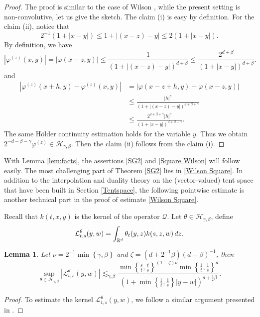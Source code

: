 \documentclass[oneside,english,a4wide]{amsart}
\numberwithin{equation}{section}
\numberwithin{figure}{section}
\theoremstyle{plain}
\theoremstyle{plain}
\theoremstyle{definition}
\theoremstyle{plain}
\newtheorem{lemma}[thm]{Lemma}
\theoremstyle{remark}
\theoremstyle{definition}
\theoremstyle{remark}
\theoremstyle{definition}
\newcommand{\real}{{\mathbb R}}
\renewcommand{\L}{{\mathcal L}}
\newcommand{\Q}{{\mathcal Q}}
\newcommand{\f}{\varphi}
\newcommand{\8}{+\infty}
\renewcommand{\1}{\mathbbm{1}}
\newcommand\sk[1]{ \left( #1 \right) }
\newcommand\lk[1]{ \left\{ #1 \right\} }
\renewcommand\d{{\rm d}}
\begin{document}
{\begin{proof}
The proof is similar to the case of Wilson \cite{Wilson2007}, while the present setting is non-convolutive, let us  give the sketch. The claim (i) is easy by definition. For the claim (ii), notice that
\[
    2^{-1} (1 + |x-y|) \leq  1 + |(x-z) - y| \leq 2(1 + |x- y|). 
\]
By definition, we have
\[
    |\f^{(z)}(x, y)| = | \f(x-z, y) | \leq \frac{1}{(1 + |(x-z) - y |)^{d+\beta} } \leq  \frac{2^{d+\beta}}{(1 + |x- y|)^{d+\beta}}.
\]
and 
\[
\begin{aligned}
    |\f^{(z)}(x + h, y) - \f^{(z)}(x, y)| & = | \f(x-z + h, y) - \f(x-z, y) | \\
    & \leq \frac{|h|^{\gamma}}{(1 + |(x-z) - y |)^{d+\beta + \gamma} } \\
    & \leq  \frac{2^{d+\beta + \gamma}|h|^{\gamma}}{(1 + |x- y|)^{d+\beta+\gamma}}.
\end{aligned}
\]
The same H\"{o}lder continuity estimation holds for the variable $y$. Thus we obtain $2^{-d-\beta-\gamma}\f^{(z)} \in \mathcal{H}_{\gamma, \beta}$. Then the claim (ii) follows from the claim (i). 
\end{proof}


With Lemma \ref{lem:facts}, the assertions \eqref{SG2} and \eqref{Square Wilson} will follow easily.
The most challenging part of Theorem \ref{SG2} lies in \eqref{Wilson Square}. In addition to the interpolation and duality theory on the (vector-valued) tent space that have been built in Section \ref{Tentspace}, the following pointwise estimate is another technical part in the proof of estimate \eqref{Wilson Square}. 


Recall that $k(t, x, y)$ is the kernel of the operator $\Q$.  Let ${\theta \in \mathcal{H}_{\gamma, \beta}}$, define
 \[
        \L^\theta_{t, s}(y, w) = \int_{\real^d}\theta_t(y, z)k(s, z, w)\,\d z.
    \]

\begin{lemma}\label{lem:thetakestimates}
Let $\nu = 2^{-1}\min\lk{ \gamma, \beta }$ and $ \zeta = (d + 2^{-1}\beta )(d + \beta)^{-1}$, then
   \[
        \sup_{ \theta \in \mathcal{H}_{\gamma, \beta} }|\L^\theta_{t, s}(y, w)| \lesssim_{\gamma, \beta}  \frac{ \min\lk{ \frac{s}{t}, \frac{t}{s} }^{ (1 - \zeta)\nu } \min\lk{ \frac{1}{t}, \frac{1}{s} }^d }{ \sk{ 1 + \min\lk{ \frac{1}{t}, \frac{1}{s} }|y - w|}^{d + \frac{1}{2}\beta} }. 
    \]    
\end{lemma}

\begin{proof}
To estimate the kernel $\L^\theta_{t, s}(y, w)$, we follow a similar argument presented in \cite[Chapter 8, 8.6.3]{Grafakos2009}. 


\end{proof}}
\end{document}
